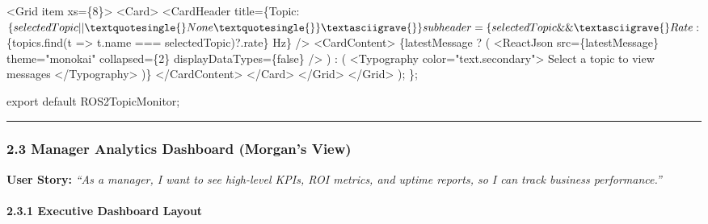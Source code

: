 \documentclass[
]{article}
\newenvironment{Shaded}{\begin{snugshade}}{\end{snugshade}}
\newcommand{\NormalTok}[1]{#1}
\begin{document}
\begin{Shaded}
\begin{Highlighting}[]
\NormalTok{      \textless{}Grid item xs=\{8\}\textgreater{}}
\NormalTok{        \textless{}Card\textgreater{}}
\NormalTok{          \textless{}CardHeader}
\NormalTok{            title=\{\textasciigrave{}Topic: $\{selectedTopic || \textquotesingle{}None\textquotesingle{}\}\textasciigrave{}\}}
\NormalTok{            subheader=\{selectedTopic \&\& \textasciigrave{}Rate: $\{topics.find(t =\textgreater{} t.name === selectedTopic)?.rate\} Hz\textasciigrave{}\}}
\NormalTok{          /\textgreater{}}
\NormalTok{          \textless{}CardContent\textgreater{}}
\NormalTok{            \{latestMessage ? (}
\NormalTok{              \textless{}ReactJson}
\NormalTok{                src=\{latestMessage\}}
\NormalTok{                theme="monokai"}
\NormalTok{                collapsed=\{2\}}
\NormalTok{                displayDataTypes=\{false\}}
\NormalTok{              /\textgreater{}}
\NormalTok{            ) : (}
\NormalTok{              \textless{}Typography color="text.secondary"\textgreater{}}
\NormalTok{                Select a topic to view messages}
\NormalTok{              \textless{}/Typography\textgreater{}}
\NormalTok{            )\}}
\NormalTok{          \textless{}/CardContent\textgreater{}}
\NormalTok{        \textless{}/Card\textgreater{}}
\NormalTok{      \textless{}/Grid\textgreater{}}
\NormalTok{    \textless{}/Grid\textgreater{}}
\NormalTok{  );}
\NormalTok{\};}

\NormalTok{export default ROS2TopicMonitor;}
\end{Highlighting}
\end{Shaded}

\begin{center}\rule{0.5\linewidth}{0.5pt}\end{center}

\hypertarget{manager-analytics-dashboard-morgans-view}{%
\subsubsection{2.3 Manager Analytics Dashboard (Morgan's
View)}\label{manager-analytics-dashboard-morgans-view}}

\textbf{User Story:} \emph{``As a manager, I want to see high-level
KPIs, ROI metrics, and uptime reports, so I can track business
performance.''}

\hypertarget{executive-dashboard-layout}{%
\paragraph{2.3.1 Executive Dashboard
Layout}\label{executive-dashboard-layout}}
\end{document}
